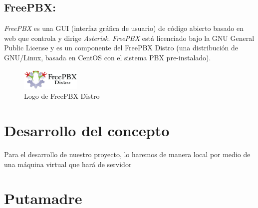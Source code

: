 \documentclass[conference]{IEEEtran}
\begin{document}
\subsection{\textbf{ FreePBX:}}  
\textit{FreePBX} es una GUI (interfaz gráfica de usuario) de código abierto basado en web que controla y dirige \textit{Asterisk}. \textit{FreePBX} está licenciado bajo la GNU General Public License y es un componente del FreePBX Distro (una distribución de GNU/Linux, basada en CentOS con el sistema PBX pre-instalado).
\begin{figure}[h]
	\centerline{\includegraphics[width=0.25\textwidth]{img/freepbx01.png}}
	\caption{Logo de FreePBX Distro}
	\label{fig:ant04}
\end{figure}


\section{Desarrollo del concepto}\label{sec:ddc}
Para el desarrollo de nuestro proyecto, lo haremos de manera local por medio de una máquina virtual que hará de servidor

\section{Putamadre}
\end{document}
